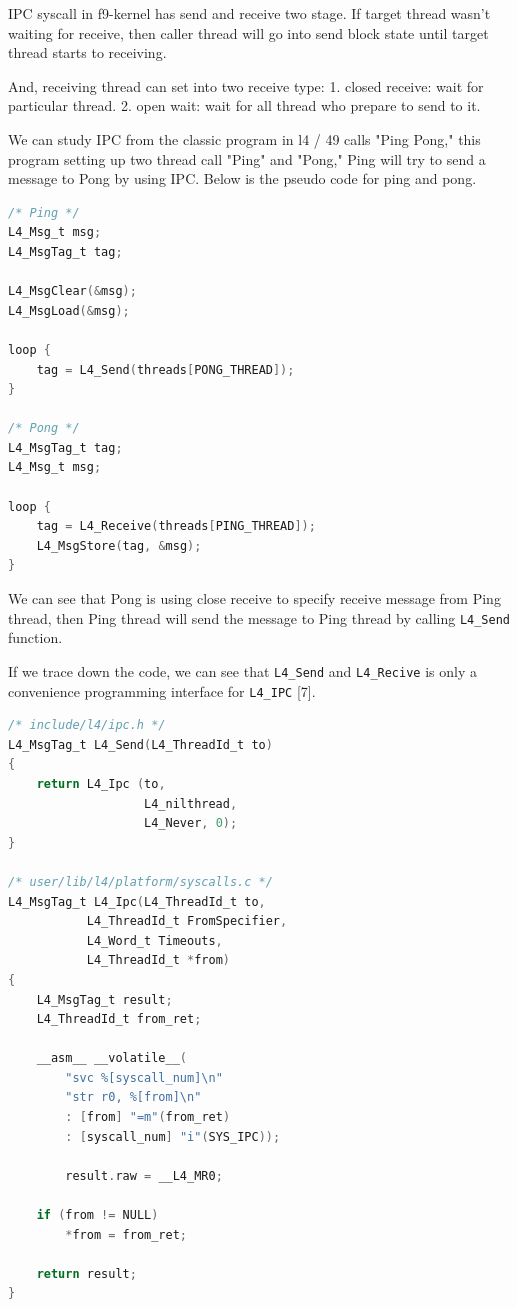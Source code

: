\documentclass[10pt,preprint,nocopyrightspace]{sigplanconf}
\begin{document}
IPC syscall in f9-kernel has send and receive two stage. If target thread wasn't waiting for receive, then caller thread will go into send block state until target thread starts to receiving.

And, receiving thread can set into two receive type: 1. closed receive: wait for particular thread. 2. open wait: wait for all thread who prepare to send to it.

We can study IPC from the classic program in l4 / 49 calls "Ping Pong," this program setting up two thread call "Ping" and "Pong," Ping will try to send a message to Pong by using IPC. Below is the pseudo code for ping and pong.

\begin{lstlisting}[language=c,frame=single,basicstyle=\small]
/* Ping */
L4_Msg_t msg;
L4_MsgTag_t tag;

L4_MsgClear(&msg);
L4_MsgLoad(&msg);

loop {
    tag = L4_Send(threads[PONG_THREAD]);
}

/* Pong */
L4_MsgTag_t tag;
L4_Msg_t msg;

loop {
    tag = L4_Receive(threads[PING_THREAD]);
    L4_MsgStore(tag, &msg);
}
\end{lstlisting}

We can see that Pong is using close receive to specify receive message from Ping thread, then Ping thread will send the message to Ping thread by calling \texttt{L4\_Send} function.

If we trace down the code, we can see that \texttt{L4\_Send} and \texttt{L4\_Recive} is only a convenience programming interface for \texttt{L4\_IPC} [7].

\begin{lstlisting}[language=c,basicstyle=\small,frame=single]
/* include/l4/ipc.h */
L4_MsgTag_t L4_Send(L4_ThreadId_t to)
{
    return L4_Ipc (to,
                   L4_nilthread,
                   L4_Never, 0);
}

/* user/lib/l4/platform/syscalls.c */
L4_MsgTag_t L4_Ipc(L4_ThreadId_t to,
           L4_ThreadId_t FromSpecifier,
           L4_Word_t Timeouts,
           L4_ThreadId_t *from)
{
    L4_MsgTag_t result;
    L4_ThreadId_t from_ret;

    __asm__ __volatile__(
        "svc %[syscall_num]\n"
        "str r0, %[from]\n"
        : [from] "=m"(from_ret)
        : [syscall_num] "i"(SYS_IPC));

        result.raw = __L4_MR0;

    if (from != NULL)
        *from = from_ret;

    return result;
}
\end{lstlisting}
\end{document}
